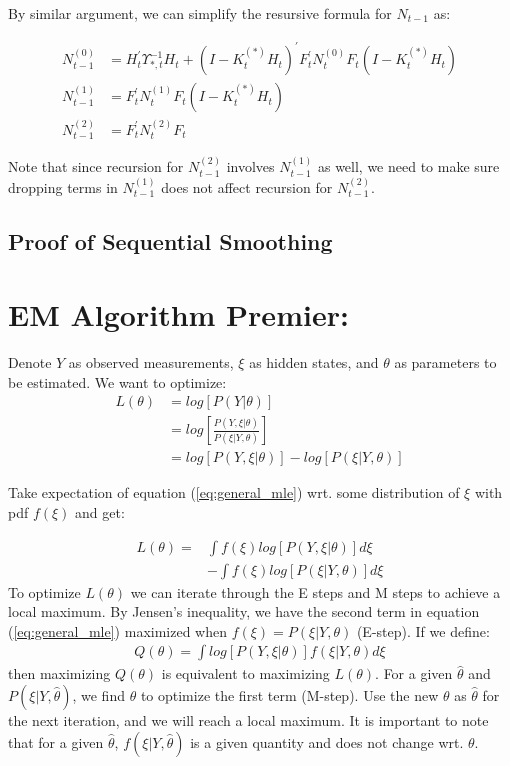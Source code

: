 \documentclass[12pt]{article}
\numberwithin{equation}{section}
\begin{document}
By similar argument, we can simplify the resursive formula for $N_{t-1}$ as: 

\begin{align*}
    N_{t-1}^{(0)} &= H_t^{'}\Upsilon_{*,t}^{-1}H_t+(I-K_t^{(*)}H_t)^{'}F_t^{'}N_t^{(0)}F_t(I-K_t^{(*)}H_t) \\
    N_{t-1}^{(1)} &= F_t^{'}N_t^{(1)}F_t(I-K_t^{(*)}H_t) \\
    N_{t-1}^{(2)} &= F_t^{'}N_t^{(2)}F_t
\end{align*}

Note that since recursion for $N_{t-1}^{(2)}$ involves $N_{t-1}^{(1)}$ as well, we need to make sure dropping terms in $N_{t-1}^{(1)}$ does not affect recursion for $N_{t-1}^{(2)}$. 

\subsection{Proof of Sequential Smoothing}

\section{EM Algorithm Premier:} \label{ap:EM_proof}
Denote $Y$ as observed measurements, $\xi$ as hidden states, and $\theta$ as parameters to be estimated. We want to optimize:
\begin{align}
    L(\theta) & = log[P(Y|\theta)] \nonumber \\
    & = log\left[\frac{P(Y,\xi|\theta)}{P(\xi|Y,\theta)}\right] \nonumber \\
    & = log[P(Y,\xi|\theta)] - log[P(\xi|Y,\theta)] \label{eq:general_mle}
\end{align}

Take expectation of equation (\ref{eq:general_mle}) wrt. some distribution of $\xi$ with pdf $f(\xi)$ and get:

\begin{align}
    L(\theta) = & \int f(\xi)log[P(Y,\xi|\theta)]d\xi \nonumber \\
    & - \int f(\xi)log[P(\xi|Y,\theta)]d\xi \nonumber
\end{align}
To optimize $L(\theta)$ we can iterate through the E steps and M steps to achieve a local maximum. By Jensen's inequality, we have the second term in equation (\ref{eq:general_mle}) maximized when $f(\xi)=P(\xi|Y,\theta)$ (E-step). If we define:
\begin{align}
    Q(\theta) = \int log[P(Y,\xi|\theta)]f(\xi|Y,\theta)d\xi \label{eq:Q}
\end{align}
then maximizing $Q(\theta)$ is equivalent to maximizing $ L(\theta)$. For a given $\hat{\theta}$ and $P(\xi|Y, \hat{\theta})$, we find $\theta$ to optimize the first term (M-step). Use the new $\theta$ as $\hat{\theta}$ for the next iteration, and we will reach a local maximum. It is important to note that for a given $\hat{\theta}$, $f(\xi|Y, \hat{\theta})$ is a given quantity and does not change wrt. $\theta$. 
\end{document}
